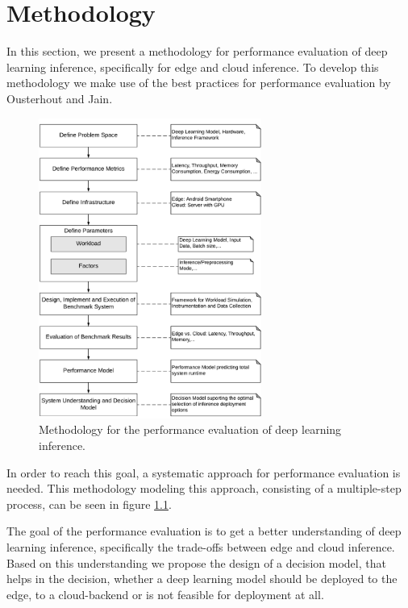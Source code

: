 \chapter{Methodology}
\label{chap:methodology}

In this section, we present a methodology for performance evaluation of deep learning inference, specifically for edge and cloud inference.
To develop this methodology we make use of the best practices for performance evaluation by Ousterhout \cite{Ousterhout:2018:AMO:3234519.3213770} and Jain\cite{books/daglib/0076234}.


\begin{figure}[!htb]
\centering
\includegraphics[width=0.65\textwidth]{./Bilder/Methodology.pdf}
\caption{Methodology for the performance evaluation of deep learning inference.}
\label{fig:Methodology}
\end{figure}
In order to reach this goal, a systematic approach for performance evaluation is needed.
This methodology modeling this approach, consisting of a multiple-step process, can be seen in figure \ref{fig:Methodology}. 


The goal of the performance evaluation is to get a better understanding of deep learning inference, specifically the trade-offs between edge and cloud inference.
Based on this understanding we propose the design of a decision model, that helps in the decision, whether a deep learning model should be deployed to the edge, to a cloud-backend or is not feasible for deployment at all.


